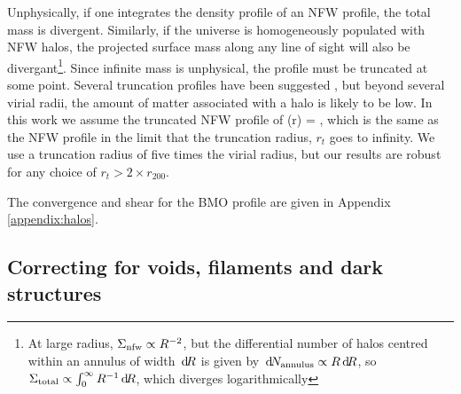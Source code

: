 \documentclass[useAMS,usenatbib]{mn2e}
\begin{document}
Unphysically, if one integrates the density profile of an NFW profile, the total mass is divergent.
Similarly, if the universe is homogeneously populated with NFW halos, the projected surface mass along any
line of sight will also be divergant\footnote{At large radius, $\Sigma_{\rm
nfw} \propto R^{-2}$, but the differential number of halos centred within an
annulus of width $\, \mathrm{d} \! R$ is given by $\, \mathrm{d} \! N_{\rm annulus} \propto R \, \mathrm{d} \! R$,
so  $\Sigma_{\rm total} \propto \int_{0}^{\infty} R^{-1} \, \mathrm{d} \! R$, which
diverges logarithmically}. Since infinite mass is unphysical, the profile must
be truncated at some point. Several truncation profiles have been suggested \citep[e.g][]{BMO}, but beyond several virial radii, the amount of matter associated with a halo is likely to be low. In this work we assume the truncated NFW profile of \citet{BMO}
\be\label{eq:bmoprofile}
\rho(r) = 
,
\ee
which is the same as the NFW profile in the limit that the truncation radius, $r_t$ goes to infinity. We use a truncation radius of five times the virial radius, but our results are robust for any choice of $r_t>2 \times r_{200}$.

The convergence and shear for the BMO profile are given in Appendix \ref{appendix:halos}.


\subsection{Correcting for voids, filaments and dark structures}
\label{subsec:voids}
\end{document}
